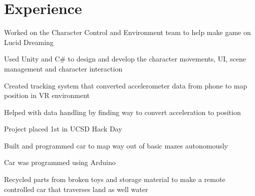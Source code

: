 \documentclass[]{deedy-resume-openfont}
\begin{document}
\begin{minipage}[t]{0.66\textwidth} 


\section{Experience}

\sectionsep
\begin{tightemize}
\item Worked on the Character Control and Environment team to help make game on Lucid Dreaming
\item Used Unity and C\# to design and develop the character movements, UI, scene management and character interaction
\end{tightemize}
\sectionsep

\begin{tightemize}
\item Created tracking system that converted accelerometer data from phone to map position in VR environment
\item Helped with data handling by finding way to convert acceleration to position
\item Project placed 1st in UCSD Hack Day
\end{tightemize}
\sectionsep

\begin{tightemize}
\item Built and programmed car to map way out of basic mazes autonomously
\item Car was programmed using Arduino
\end{tightemize}
\sectionsep

\begin{tightemize}
\item Recycled parts from broken toys and storage material to make a remote controlled car that traverses land as well water
\end{tightemize}
\sectionsep

\sectionsep


\end{minipage}
\end{document}
